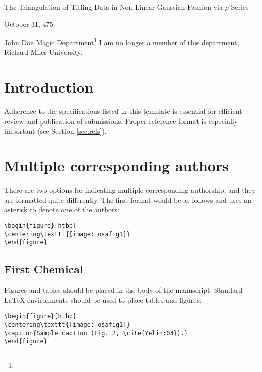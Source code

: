 \documentclass[twocolumn]{article}
\begin{document}
\title{} The Triangulation of Titling Data in
       Non-Linear Gaussian Fashion via $\rho$ Series\date{} October 31, 475.
\author{}John Doe Magic Department\thanks{} I am no longer a member of this department, Richard Miles University.
 
\begin{abstract}
    \LaTeX{} manuscripts submitted to OSA journals may use these instructions and this universal template format. The template simplifies manuscript preparation and eases transfer between OSA journals. Applied Optics, JOSA A, JOSA B, Optics Letters, and Optica authors may also use the previous, legacy templates, particularly if a precise length estimate is needed. Authors will still need to adhere to article-length restrictions based on the final, published format.
\end{abstract}

\section {Introduction}
Adherence to the specifications listed in this template is essential for efficient review and publication of submissions. Proper reference format is especially important (see Section \ref{sec:refs}).

\section{Multiple corresponding authors}
There are two options for indicating multiple corresponding authorship, and they are formatted quite differently. The first format would be as follows and uses an asterisk to denote one of the authors:
\begin{verbatim}
\begin{figure}[htbp]
\centering\texttt{[image: osafig1]}
\end{figure}
\end{verbatim}

\subsection{First Chemical}
Figures and tables should be placed in the body of the manuscript. Standard \LaTeX{} environments should be used to place tables and figures:
\begin{verbatim}
\begin{figure}[htbp]
\centering\texttt{[image: osafig1]}
\caption{Sample caption (Fig. 2, \cite{Yelin:03}).}
\end{figure}
\end{verbatim}
\end{document}
